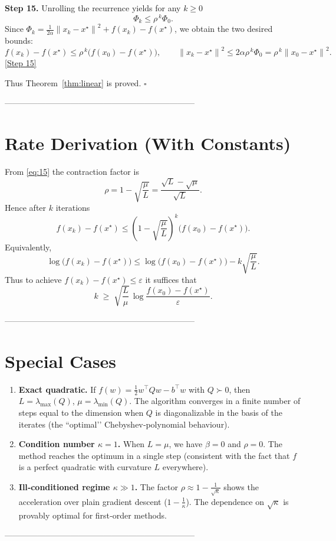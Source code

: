 \documentclass{article}
\newcommand{\norm}[1]{\left\lVert#1\right\rVert}
\begin{document}
\medskip
\noindent\textbf{Step 15.} Unrolling the recurrence yields for any $k\ge0$
\[
\Phi_{k}\le \rho^{\,k}\Phi_{0}.
\]
Since $\Phi_{k}= \tfrac{1}{2\alpha}\norm{x_{k}-x^{\star}}^{2}+f(x_{k})-f(x^{\star})$, we obtain the two desired bounds:
\[
f(x_{k})-f(x^{\star})\le \rho^{\,k}\bigl(f(x_{0})-f(x^{\star})\bigr),\qquad
\norm{x_{k}-x^{\star}}^{2}\le 2\alpha\rho^{\,k}\Phi_{0}
      =\rho^{\,k}\norm{x_{0}-x^{\star}}^{2}.
\tag{16}
\]
\noindent\underline{[Step 15]}

Thus Theorem~\ref{thm:linear} is proved. $\square$

---------------------------------------------------------------------

\section*{Rate Derivation (With Constants)}
From \eqref{eq:15} the contraction factor is
\[
\rho = 1-\sqrt{\frac{\mu}{L}}
      = \frac{\sqrt{L}-\sqrt{\mu}}{\sqrt{L}}.
\]
Hence after $k$ iterations
\[
f(x_{k})-f(x^{\star})
   \le \left(1-\sqrt{\frac{\mu}{L}}\right)^{k}
        \bigl(f(x_{0})-f(x^{\star})\bigr).
\]
Equivalently,
\[
\log\bigl(f(x_{k})-f(x^{\star})\bigr)
   \le \log\bigl(f(x_{0})-f(x^{\star})\bigr)
      -k\sqrt{\frac{\mu}{L}}.
\]
Thus to achieve $f(x_{k})-f(x^{\star})\le\varepsilon$ it suffices that
\[
k\;\ge\; \sqrt{\frac{L}{\mu}}\,
          \log\!\frac{f(x_{0})-f(x^{\star})}{\varepsilon}.
\]

---------------------------------------------------------------------

\section*{Special Cases}
\begin{enumerate}[leftmargin=*]
\item \textbf{Exact quadratic.} If $f(w)=\tfrac12 w^{\top}Q w-b^{\top}w$ with $Q\succ0$, then $L=\lambda_{\max}(Q)$, $\mu=\lambda_{\min}(Q)$. The algorithm converges in a finite number of steps equal to the dimension when $Q$ is diagonalizable in the basis of the iterates (the ``optimal’’ Chebyshev‑polynomial behaviour).

\item \textbf{Condition number $\kappa=1$.} When $L=\mu$, we have $\beta=0$ and $\rho=0$. The method reaches the optimum in a single step (consistent with the fact that $f$ is a perfect quadratic with curvature $L$ everywhere).

\item \textbf{Ill‑conditioned regime $\kappa\gg1$.} The factor $\rho\approx 1-\frac{1}{\sqrt{\kappa}}$ shows the acceleration over plain gradient descent ($1-\frac{1}{\kappa}$). The dependence on $\sqrt{\kappa}$ is provably optimal for first‑order methods.

\end{enumerate}

---------------------------------------------------------------------
\end{document}
